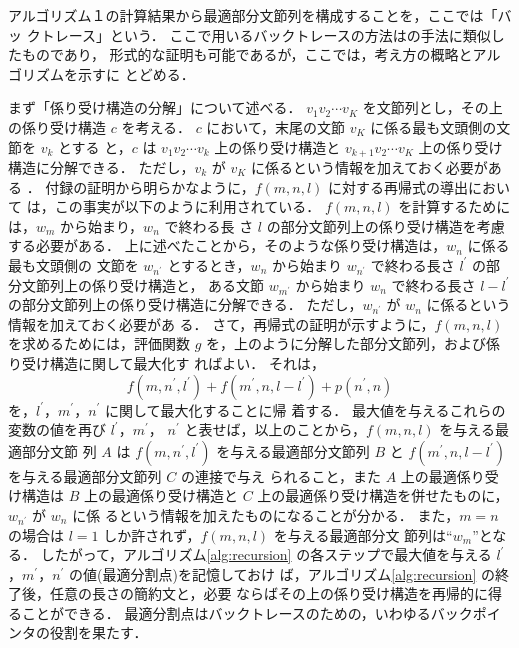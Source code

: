 アルゴリズム１の計算結果から最適部分文節列を構成することを，ここでは「バッ
クトレース」という．
ここで用いるバックトレースの方法は\cite{ozeki}の手法に類似したものであり，
形式的な証明も可能であるが，ここでは，考え方の概略とアルゴリズムを示すに
とどめる．

まず「係り受け構造の分解」について述べる．
$v_{1}v_{2}\cdots v_{K}$ を文節列とし，その上の係り受け構造 $c$ を考える．
$c$ において，末尾の文節 $v_{K}$ に係る最も文頭側の文節を $v_{k}$ とする
と，$c$ は $v_{1}v_{2}\cdots v_{k}$ 上の係り受け構造と
$v_{k+1}v_{2}\cdots v_{K}$ 上の係り受け構造に分解できる．
ただし，$v_{k}$ が $v_{K}$ に係るという情報を加えておく必要がある
\cite{ozeki}．
付録の証明から明らかなように，$f(m, n, l)$ に対する再帰式の導出において
は，この事実が以下のように利用されている．
$f(m, n, l)$ を計算するためには，$w_{m}$ から始まり，$w_{n}$ で終わる長
さ $l$ の部分文節列上の係り受け構造を考慮する必要がある．
上に述べたことから，そのような係り受け構造は，$w_{n}$ に係る最も文頭側の
文節を $w_{n^{\prime}}$ とするとき，$w_{n}$ から始まり $w_{n^{\prime}}$ 
で終わる長さ $l^{\prime}$ の部分文節列上の係り受け構造と，
ある文節 $w_{m^{\prime}}$ から始まり $w_{n}$ で終わる長さ $l-l^{\prime}$ 
の部分文節列上の係り受け構造に分解できる．
ただし，$w_{n^{\prime}}$ が $w_{n}$ に係るという情報を加えておく必要があ
る．
さて，再帰式の証明が示すように，$f(m, n, l)$ を求めるためには，評価関数 
$g$ を，上のように分解した部分文節列，および係り受け構造に関して最大化す
ればよい．
それは，
\begin{displaymath}
f(m, n^{\prime}, l^{\prime})+f(m^{\prime}, n, l-l^{\prime})
+p(n^{\prime}, n) 
\end{displaymath}
を，$l^{\prime}$，$m^{\prime}$，$n^{\prime}$ に関して最大化することに帰
着する．
最大値を与えるこれらの変数の値を再び $l^{\prime}$，$m^{\prime}$，
$n^{\prime}$ と表せば，以上のことから，$f(m, n, l)$ を与える最適部分文節
列 $A$ は $f(m, n^{\prime}, l^{\prime})$ を与える最適部分文節列 $B$ と 
$f(m^{\prime}, n, l-l^{\prime})$ を与える最適部分文節列 $C$ の連接で与え
られること，また $A$ 上の最適係り受け構造は $B$ 上の最適係り受け構造と 
$C$ 上の最適係り受け構造を併せたものに，$w_{n^{\prime}}$ が $w_{n}$ に係
るという情報を加えたものになることが分かる．
また，$m=n$ の場合は $l=1$ しか許されず，$f(m, n, l)$ を与える最適部分文
節列は``$w_{m}$''となる．
したがって，アルゴリズム\ref{alg:recursion} の各ステップで最大値を与える
$l^{\prime}$，$m^{\prime}$，$n^{\prime}$ の値(最適分割点)を記憶しておけ
ば，アルゴリズム\ref{alg:recursion} の終了後，任意の長さの簡約文と，必要
ならばその上の係り受け構造を再帰的に得ることができる．
最適分割点はバックトレースのための，いわゆるバックポインタの役割を果たす．


